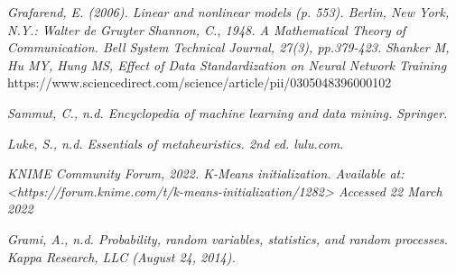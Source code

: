 \documentclass[11pt]{article}
\begin{document}
		 
		
	
	\pagebreak
	\begin{thebibliography}{1}	
		\textit{Grafarend, E. (2006). Linear and nonlinear models (p. 553). Berlin, New York, N.Y.: Walter de Gruyter}
		\textit{Shannon, C., 1948. A Mathematical Theory of Communication. Bell System Technical Journal, 27(3), pp.379-423.}
		\textit{Shanker M, Hu MY, Hung MS, Effect of Data Standardization on Neural Network Training} https://www.sciencedirect.com/science/article/pii/0305048396000102
		
		\textit{Sammut, C., n.d. Encyclopedia of machine learning and data mining. Springer.}
		
		\textit{Luke, S., n.d. Essentials of metaheuristics. 2nd ed. lulu.com.}
		
		\textit{KNIME Community Forum, 2022. K-Means initialization. Available at: <https://forum.knime.com/t/k-means-initialization/1282> Accessed 22 March 2022}
		
		\textit{Grami, A., n.d. Probability, random variables, statistics, and random processes. Kappa Research, LLC (August 24, 2014).}
		
		
	\end{thebibliography}
\end{document}
